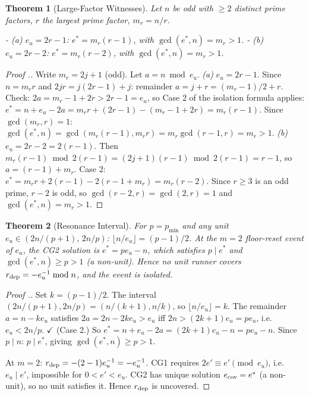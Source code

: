 \documentclass[11pt,a4paper]{article}
\theoremstyle{plain}
\newtheorem{theorem}{Theorem}[section]
\theoremstyle{definition}
\theoremstyle{remark}
\begin{document}
\begin{theorem}[Large-Factor Witnesses]
Let $n$ be odd with $\geq 2$ distinct prime factors, $r$ the largest prime factor, $m_r = n/r$.

- \textit{(a)} $e_u = 2r-1$: \textit{$e^* = m_r(r-1)$, with $\gcd(e^*, n) = m_r > 1$.}
- \textit{(b)} $e_u = 2r-2$: \textit{$e^* = m_r(r-2)$, with $\gcd(e^*, n) = m_r > 1$.}

\end{theorem}

\begin{proof}[Proof .]
Write $m_r = 2j+1$ (odd). Let $a = n \bmod e_u$. \textit{(a)} $e_u = 2r-1$. Since $n = m_r r$ and $2jr = j(2r-1)+j$: remainder $a = j + r = (m_r-1)/2 + r$. Check: $2a = m_r - 1 + 2r > 2r - 1 = e_u$, so Case 2 of the isolation formula applies: $e^* = n + e_u - 2a = m_r r + (2r-1) - (m_r-1+2r) = m_r(r-1)$. Since $\gcd(m_r, r) = 1$: $\gcd(e^*, n) = \gcd(m_r(r-1), m_r r) = m_r\gcd(r-1,r) = m_r > 1$. \textit{(b)} $e_u = 2r-2 = 2(r-1)$. Then $m_r(r-1) \bmod 2(r-1) = (2j+1)(r-1) \bmod 2(r-1) = r-1$, so $a = (r-1)+m_r$. Case 2: $e^* = m_r r + 2(r-1) - 2(r-1+m_r) = m_r(r-2)$. Since $r \geq 3$ is an odd prime, $r-2$ is odd, so $\gcd(r-2, r) = \gcd(2, r) = 1$ and $\gcd(e^*, n) = m_r > 1$.
\end{proof}


\begin{theorem}[Resonance Interval]
For $p = p_{\min}$ and any unit $e_u \in (2n/(p+1),\, 2n/p)$: $\lfloor n/e_u \rfloor = (p-1)/2$. At the $m = 2$ floor-reset event of $e_u$, the CG2 solution is $e^* = pe_u - n$, which satisfies $p \mid e^*$ and $\gcd(e^*, n) \geq p > 1$ (a non-unit). Hence no unit runner covers $r_{\rm dep} = -e_u^{-1} \bmod n$, and the event is isolated.

\end{theorem}

\begin{proof}[Proof .]
Set $k = (p-1)/2$. The interval $(2n/(p+1), 2n/p) = (n/(k+1), n/k)$, so $\lfloor n/e_u \rfloor = k$. The remainder $a = n - ke_u$ satisfies $2a = 2n - 2ke_u > e_u$ iff $2n > (2k+1)e_u = pe_u$, i.e.\ $e_u < 2n/p$. $\checkmark$ (Case 2.) So $e^* = n + e_u - 2a = (2k+1)e_u - n = pe_u - n$. Since $p \mid n$: $p \mid e^*$, giving $\gcd(e^*, n) \geq p > 1$.

At $m = 2$: $r_{\rm dep} = -(2-1)e_u^{-1} = -e_u^{-1}$. CG1 requires $2e' \equiv e' \pmod{e_u}$, i.e.\ $e_u \mid e'$, impossible for $0 < e' < e_u$. CG2 has unique solution $e_{\rm cov} = e^*$ (a non-unit), so no unit satisfies it. Hence $r_{\rm dep}$ is uncovered.
\end{proof}
\end{document}
